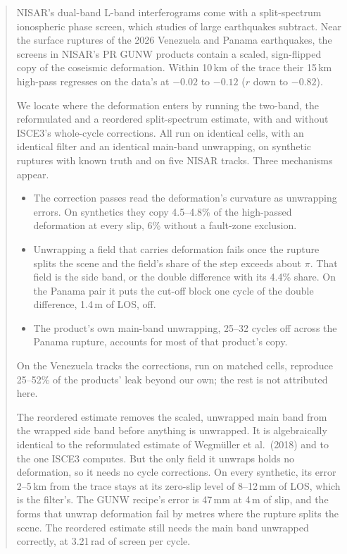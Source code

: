 \begin{abstract}
NISAR's dual-band L-band interferograms come with a split-spectrum ionospheric phase screen, which studies of large
earthquakes subtract. Near the surface ruptures of the 2026 Venezuela and Panama earthquakes, the screens in NISAR's
PR GUNW products contain a scaled, sign-flipped copy of the coseismic deformation. Within 10\,km of the trace their
15\,km high-pass regresses on the data's at $-0.02$ to $-0.12$ ($r$ down to $-0.82$).

We locate where the deformation enters by running the two-band, the reformulated and a reordered split-spectrum
estimate, with and without ISCE3's whole-cycle corrections. All run on identical cells, with an identical filter and
an identical main-band unwrapping, on synthetic ruptures with known truth and on five NISAR tracks. Three mechanisms
appear.
\begin{itemize}
  \item The correction passes read the deformation's curvature as unwrapping errors. On synthetics they copy
        4.5--4.8\% of the high-passed deformation at every slip, 6\% without a fault-zone exclusion.
  \item Unwrapping a field that carries deformation fails once the rupture splits the scene and the field's share of
        the step exceeds about $\pi$. That field is the side band, or the double difference with its 4.4\% share. On the
        Panama pair it puts the cut-off block one cycle of the double difference, 1.4\,m of LOS, off.
  \item The product's own main-band unwrapping, 25--32 cycles off across the Panama rupture, accounts for most of
        that product's copy.
\end{itemize}
On the Venezuela tracks the corrections, run on matched cells, reproduce 25--52\% of the products' leak beyond our
own; the rest is not attributed here.

The reordered estimate removes the scaled, unwrapped main band from the wrapped side band before anything is
unwrapped. It is algebraically identical to the reformulated estimate of Wegm\"uller et al.\ (2018) and to the one
ISCE3 computes. But the only field it unwraps holds no deformation, so it needs no cycle corrections. On every
synthetic, its error 2--5\,km from the trace stays at its zero-slip level of 8--12\,mm of LOS, which is the filter's.
The GUNW recipe's error is 47\,mm at 4\,m of slip, and the forms that unwrap deformation fail by metres where the
rupture splits the scene. The reordered estimate still needs the main band unwrapped correctly, at 3.21\,rad of
screen per cycle.


\end{abstract}
